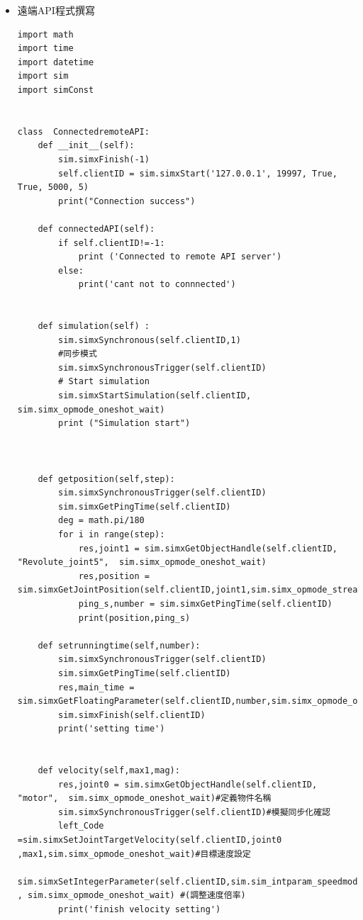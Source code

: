 \documentclass[14pt,a4paper]{report}  %
\begin{document}
{     
     
     \begin{itemize}
     \item 遠端API程式撰寫
     \hspace*{\fill} \\
		\begin{lstlisting}[caption=遠端API程式架構]
import math 
import time
import datetime
import sim 
import simConst


class  ConnectedremoteAPI:
    def __init__(self):
        sim.simxFinish(-1)
        self.clientID = sim.simxStart('127.0.0.1', 19997, True, True, 5000, 5)
        print("Connection success")
          
    def connectedAPI(self):
        if self.clientID!=-1:
            print ('Connected to remote API server')
        else:
            print('cant not to connnected')
            
        
    def simulation(self) :
        sim.simxSynchronous(self.clientID,1)
        #同步模式
        sim.simxSynchronousTrigger(self.clientID)
        # Start simulation
        sim.simxStartSimulation(self.clientID, sim.simx_opmode_oneshot_wait)
        print ("Simulation start")

        
    
    def getposition(self,step):
        sim.simxSynchronousTrigger(self.clientID)
        sim.simxGetPingTime(self.clientID)
        deg = math.pi/180
        for i in range(step):
            res,joint1 = sim.simxGetObjectHandle(self.clientID, "Revolute_joint5",  sim.simx_opmode_oneshot_wait)
            res,position = sim.simxGetJointPosition(self.clientID,joint1,sim.simx_opmode_streaming)
            ping_s,number = sim.simxGetPingTime(self.clientID)
            print(position,ping_s)
   
    def setrunningtime(self,number):
        sim.simxSynchronousTrigger(self.clientID)
        sim.simxGetPingTime(self.clientID)
        res,main_time = sim.simxGetFloatingParameter(self.clientID,number,sim.simx_opmode_oneshot_wait)
        sim.simxFinish(self.clientID)
        print('setting time')
        
      
    def velocity(self,max1,mag):
        res,joint0 = sim.simxGetObjectHandle(self.clientID, "motor",  sim.simx_opmode_oneshot_wait)#定義物件名稱
        sim.simxSynchronousTrigger(self.clientID)#模擬同步化確認
        left_Code =sim.simxSetJointTargetVelocity(self.clientID,joint0 ,max1,sim.simx_opmode_oneshot_wait)#目標速度設定
        sim.simxSetIntegerParameter(self.clientID,sim.sim_intparam_speedmodifier,mag , sim.simx_opmode_oneshot_wait) #(調整速度倍率)
        print('finish velocity setting')
        

\end{lstlisting}
\end{itemize}}
\end{document}
